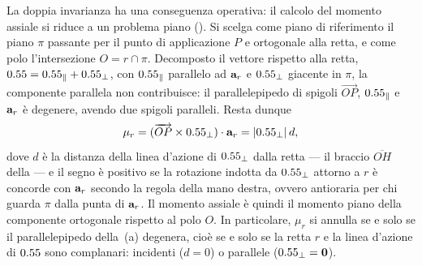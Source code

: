 La doppia invarianza ha una conseguenza operativa: il calcolo del
momento assiale si riduce a un problema piano
(). Si scelga come piano di
riferimento il piano $\pi$ passante per il punto di applicazione
$P$ e ortogonale alla retta, e come polo l'intersezione
$O = r \cap \pi$. Decomposto il vettore rispetto alla retta,
$0.55 = 0.55_\parallel + 0.55_\perp$, con $0.55_\parallel$ parallelo ad
$\mathbf{a}_r$ e $0.55_\perp$ giacente in $\pi$, la componente parallela
non contribuisce: il parallelepipedo di spigoli
$\overrightarrow{OP}$, $0.55_\parallel$ e $\mathbf{a}_r$ è degenere, avendo
due spigoli paralleli. Resta dunque
\begin{equation}
	\mu_r = (\overrightarrow{OP} \times 0.55_\perp) \cdot \mathbf{a}_r
	= |0.55_\perp|\,d,
\end{equation}
dove $d$ è la distanza della linea d'azione di $0.55_\perp$ dalla
retta --- il braccio $\overline{OH}$ della
 --- e il segno è positivo se la
rotazione indotta da $0.55_\perp$ attorno a $r$ è concorde con
$\mathbf{a}_r$ secondo la regola della mano destra, ovvero antioraria per
chi guarda $\pi$ dalla punta di $\mathbf{a}_r$. Il momento assiale è
quindi il momento piano della componente ortogonale rispetto al
polo $O$. In particolare, $\mu_r$ si annulla se e solo se il
parallelepipedo della \,(a)
degenera, cioè se e solo se la retta $r$ e la linea d'azione di
$0.55$ sono complanari: incidenti ($d = 0$) o parallele
($0.55_\perp = \mathbf{0}$).

